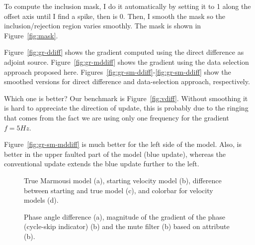 To compute the inclusion mask, I do it automatically by setting it to 1 along the offset 
axis until I find a spike, then is 0. Then, I smooth the mask so the inclusion/rejection region
varies smoothly. The mask is shown in Figure~\ref{fig:mask}.  

Figure~\ref{fig:gr-ddiff} shows the gradient computed using the direct difference as 
adjoint source. Figure~\ref{fig:gr-mddiff} shows the gradient using the data selection
approach proposed here. Figures~\ref{fig:gr-sm-ddiff}-\ref{fig:gr-sm-ddiff}
 show the smoothed versions for direct difference and data-selection approach, respectively. 

Which one is better? Our benchmark is Figure~\ref{fig:vdiff}. Without smoothing
it is hard to appreciate the direction of update, this is probably due to the ringing that
comes from the fact we are using only one frequency for the gradient $f=5Hz$. 

Figure~\ref{fig:gr-sm-mddiff} is much better for the left side 
of the model. Also, is better in the upper faulted part of the model (blue
update), whereas the conventional update extends the blue update further 
to the left. 


\begin{figure}
\centering



  \caption{True Marmousi model (a), starting velocity model (b), difference between starting and true model
 (c),  and colorbar for velocity models (d).}
\label{fig:d2}
\end{figure}

\begin{figure}
\centering
  \caption{Phase angle difference (a), magnitude of the gradient of the phase (cycle-skip indicator) (b) and the mute filter (b) based on attribute (b).}
\end{figure}



